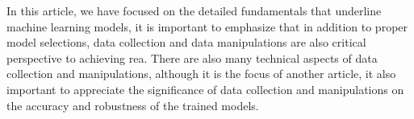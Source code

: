
\par
In this article, we have focused on the detailed fundamentals that underline machine learning models, it is important to emphasize that in addition to proper model selections, data collection and data manipulations are also critical perspective to achieving rea. There are also many technical aspects of data collection and manipulations, although it is the focus of another article, it also important to appreciate the significance of data collection and manipulations on the accuracy and robustness of the trained models.
\par 
